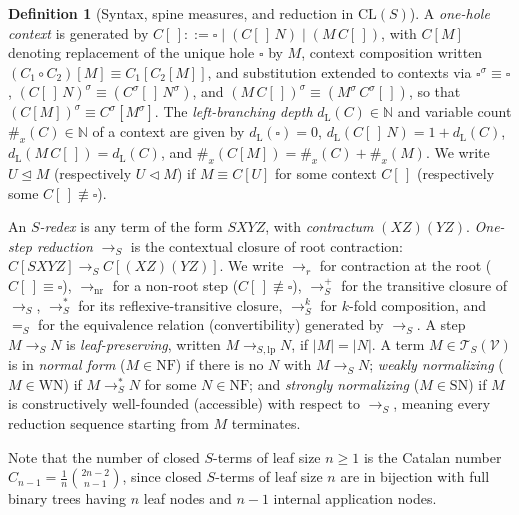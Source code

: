 \documentclass[11pt,reqno]{amsart}
\numberwithin{equation}{section}
\theoremstyle{plain}
\theoremstyle{definition}
\newtheorem{definition}[theorem]{Definition}
\theoremstyle{remark}
\newcommand{\CLS}{\mathrm{CL}(S)}
\newcommand{\TSV}{\mathcal{T}_S(\mathcal{V})}
\newcommand{\NF}{\mathrm{NF}}
\newcommand{\SN}{\mathrm{SN}}
\newcommand{\WN}{\mathrm{WN}}
\newcommand{\redS}{\to_S}
\newcommand{\redSp}{\to_S^+}
\newcommand{\redSs}{\to_S^*}
\newcommand{\convS}{=_S}
\begin{document}
\begin{definition}[Syntax, spine measures, and reduction in $\CLS$]
A \emph{one-hole context} is generated by $C[\,] ::= \square \mid (C[\,]\,N) \mid (M\,C[\,])$, with $C[M]$ denoting replacement of the unique hole $\square$ by $M$, context composition written $(C_1 \circ C_2)[M] \equiv C_1[C_2[M]]$, and substitution extended to contexts via $\square^\sigma \equiv \square$, $(C[\,]\,N)^\sigma \equiv (C^\sigma[\,]\,N^\sigma)$, and $(M\,C[\,])^\sigma \equiv (M^\sigma\,C^\sigma[\,])$, so that $(C[M])^\sigma \equiv C^\sigma[M^\sigma]$. The \emph{left-branching depth} $d_{\mathrm{L}}(C) \in \mathbb{N}$ and variable count $\#_x(C) \in \mathbb{N}$ of a context are given by $d_{\mathrm{L}}(\square) = 0$, $d_{\mathrm{L}}(C[\,]\,N) = 1 + d_{\mathrm{L}}(C)$, $d_{\mathrm{L}}(M\,C[\,]) = d_{\mathrm{L}}(C)$, and $\#_x(C[M]) = \#_x(C) + \#_x(M)$. We write $U \trianglelefteq M$ (respectively $U \triangleleft M$) if $M \equiv C[U]$ for some context $C[\,]$ (respectively some $C[\,] \not\equiv \square$).

An \emph{$S$-redex} is any term of the form $S X Y Z$, with \emph{contractum} $(X Z)(Y Z)$. \emph{One-step reduction} $\redS$ is the contextual closure of root contraction: $C[S X Y Z] \redS C[(X Z)(Y Z)]$. We write $\to_r$ for contraction at the root ($C[\,] \equiv \square$), $\to_{\mathrm{nr}}$ for a non-root step ($C[\,] \not\equiv \square$), $\redSp$ for the transitive closure of $\redS$, $\redSs$ for its reflexive-transitive closure, $\redS^k$ for $k$-fold composition, and $\convS$ for the equivalence relation (convertibility) generated by $\redS$. A step $M \redS N$ is \emph{leaf-preserving}, written $M \to_{S,\mathrm{lp}} N$, if $|M| = |N|$. A term $M \in \TSV$ is in \emph{normal form} ($M \in \NF$) if there is no $N$ with $M \redS N$; \emph{weakly normalizing} ($M \in \WN$) if $M \redSs N$ for some $N \in \NF$; and \emph{strongly normalizing} ($M \in \SN$) if $M$ is constructively well-founded (accessible) with respect to $\redS$, meaning every reduction sequence starting from $M$ terminates.
\end{definition}

Note that the number of closed $S$-terms of leaf size $n \ge 1$ is the Catalan number $C_{n-1} = \frac{1}{n}\binom{2n-2}{n-1}$, since closed $S$-terms of leaf size $n$ are in bijection with full binary trees having $n$ leaf nodes and $n-1$ internal application nodes.
\end{document}
